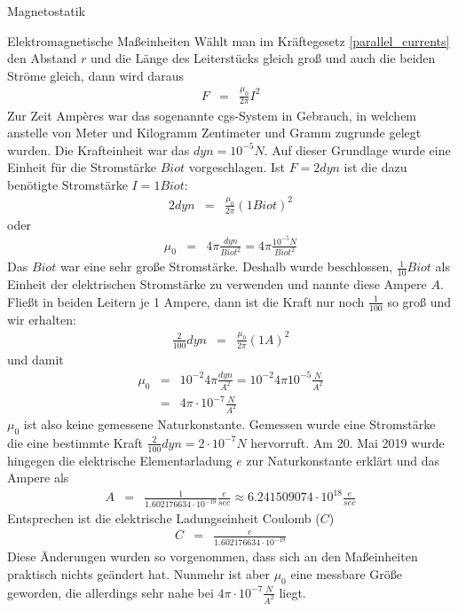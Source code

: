 \begin{chapter}{\titlestr}
\begin{section}{Magnetostatik}
\begin{subsection}{Elektromagnetische Maßeinheiten}
Wählt man im Kräftegesetz \ref{parallel_currents} den Abstand $r$ und die Länge des Leiterstücks gleich groß und auch die beiden Ströme gleich, dann wird daraus
\begin{eqnarray*}
F &=& \frac{\mu_0}{2\pi}I^2
\end{eqnarray*}
Zur Zeit Ampères war das sogenannte cgs-System in Gebrauch, in welchem anstelle von Meter und Kilogramm Zentimeter und Gramm zugrunde gelegt wurden.
Die Krafteinheit war das $dyn=10^{-5}N$. Auf dieser Grundlage wurde eine Einheit für die Stromstärke $Biot$ vorgeschlagen. Ist $F=2dyn$ ist die dazu benötigte Stromstärke $I=1Biot$:
\begin{eqnarray*}
2dyn &=& \frac{\mu_0}{2\pi}(1Biot)^2
\end{eqnarray*}
oder 
\begin{eqnarray*}
\mu_0 &=& 4\pi\frac{dyn}{Biot^2}=4\pi\frac{10^{-5}N}{Biot^2}
\end{eqnarray*}
Das $Biot$ war eine sehr große Stromstärke. Deshalb wurde beschlossen, $\frac{1}{10}Biot$ als Einheit der elektrischen Stromstärke zu verwenden und nannte diese Ampere $A$. Fließt in beiden Leitern je 1 Ampere,
dann ist die Kraft nur noch $\frac{1}{100}$ so groß und wir erhalten:
\begin{eqnarray*}
\frac{2}{100}dyn &=& \frac{\mu_0}{2\pi}(1A)^2
\end{eqnarray*}
und damit
\begin{eqnarray*}
\mu_0 &=& 10^{-2}4\pi\frac{dyn}{A^2}=10^{-2}4\pi 10^{-5}\frac{N}{A^2}\\
&=& 4\pi\cdot 10^{-7}\frac{N}{A^2}
\end{eqnarray*}
$\mu_0$ ist also keine gemessene Naturkonstante. Gemessen wurde eine Stromstärke die eine bestimmte Kraft $\frac{2}{100}dyn=2\cdot 10^{-7}N$ hervorruft.
Am 20. Mai 2019 wurde hingegen die elektrische Elementarladung $e$ zur Naturkonstante erklärt und das Ampere als
\begin{eqnarray*}
A &=& \frac{1}{1.602176634\cdot 10^{-19}}\frac{e}{sec} \approx 6.241509074\cdot 10^{18}\frac{e}{sec}
\end{eqnarray*}
Entsprechen ist die elektrische Ladungseinheit Coulomb ($C$)
\begin{eqnarray*}
C &=& \frac{e}{1.602176634\cdot 10^{-19}}
\end{eqnarray*}
Diese Änderungen wurden so vorgenommen, dass sich an den Maßeinheiten praktisch nichts geändert hat. Nunmehr ist aber $\mu_0$ eine messbare Größe geworden, die allerdings sehr nahe bei $4\pi\cdot 10^{-7}\frac{N}{A^2}$ liegt.
\end{subsection}


\end{section}
\end{chapter}

